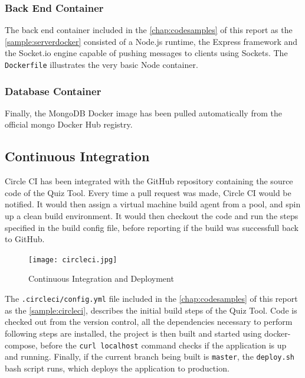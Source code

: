 \subsubsection{Back End Container}
The back end container included in the \autoref{chap:codesamples} of this report
as the \autoref{sample:serverdocker} consisted of a Node.js runtime, the Express framework and the Socket.io
engine capable of pushing messages to clients using Sockets. The \texttt{Dockerfile} illustrates
the very basic Node container.

\subsubsection{Database Container}
Finally, the MongoDB Docker image has been pulled automatically from the official mongo
Docker Hub registry\cite{36}.

\subsection{Continuous Integration}
\label{subsection:ci}
Circle CI has been integrated with the GitHub repository containing the source code of the
Quiz Tool. Every time a pull request was made, Circle CI would be notified. It would then
assign a virtual machine build agent from a pool, and spin up a clean build environment.
It would then checkout the code and run the steps specified in the build config file, before
reporting if the build was successfull back to GitHub.

\begin{figure}[ht]
    \centering
    \texttt{[image: circleci.jpg]}
    \caption{Continuous Integration and Deployment}
    \label{fig:ci}
\end{figure}

The \texttt{.circleci/config.yml} file included in the \autoref{chap:codesamples} of this report
as the \autoref{sample:circleci}, describes the initial build steps of the Quiz Tool.
Code is checked out from the version control, all the dependencies necessary to perform following
steps are installed, the project is then built and started using docker-compose, before the
\texttt{curl localhost} command checks if the application is up and running. Finally, if
the current branch being built is \texttt{master}, the \texttt{deploy.sh} bash script runs, which
deploys the application to production.

